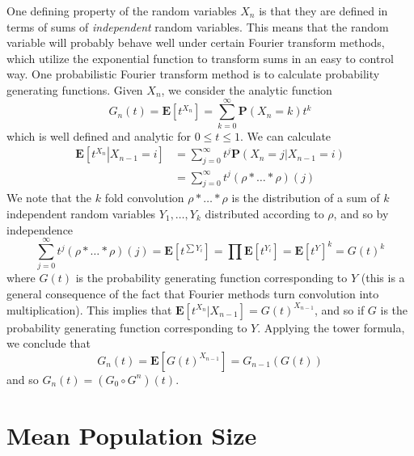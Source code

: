 One defining property of the random variables $X_n$ is that they are defined in terms of sums of {\it independent} random variables. This means that the random variable will probably behave well under certain Fourier transform methods, which utilize the exponential function to transform sums in an easy to control way. One probabilistic Fourier transform method is to calculate probability generating functions. Given $X_n$, we consider the analytic function
%
\[ G_n(t) = \mathbf{E} \left[ t^{X_n} \right] = \sum_{k = 0}^\infty \mathbf{P}(X_n = k) t^k \]
%
which is well defined and analytic for $0 \leq t \leq 1$. We can calculate
%
\begin{align*}
    \mathbf{E} \left.\left[ t^{X_n} \right| X_{n-1} = i \right] &= \sum_{j = 0}^\infty t^j \mathbf{P}(X_n = j | X_{n-1} = i)\\
    &= \sum_{j = 0}^\infty t^j (\rho * \dots * \rho)(j)
\end{align*}
%
We note that the $k$ fold convolution $\rho * \dots * \rho$ is the distribution of a sum of $k$ independent random variables $Y_1, \dots, Y_k$ distributed according to $\rho$, and so by independence
%
\[ \sum_{j = 0}^\infty t^j (\rho * \dots * \rho)(j) = \mathbf{E} \left[ t^{\sum Y_i} \right] = \prod \mathbf{E} \left[ t^{Y_i} \right] = \mathbf{E} \left[ t^Y \right]^k = G(t)^k \]
%
where $G(t)$ is the probability generating function corresponding to $Y$ (this is a general consequence of the fact that Fourier methods turn convolution into multiplication). This implies that $\mathbf{E}[t^{X_n}|X_{n-1}] = G(t)^{X_{n-1}}$, and so if $G$ is the probability generating function corresponding to $Y$. Applying the tower formula, we conclude that
%
\[ G_n(t) = \mathbf{E} \left[ G(t)^{X_{n-1}} \right] = G_{n-1}(G(t)) \]
%
and so $G_n(t) = (G_0 \circ G^n)(t)$.

\section{Mean Population Size}

